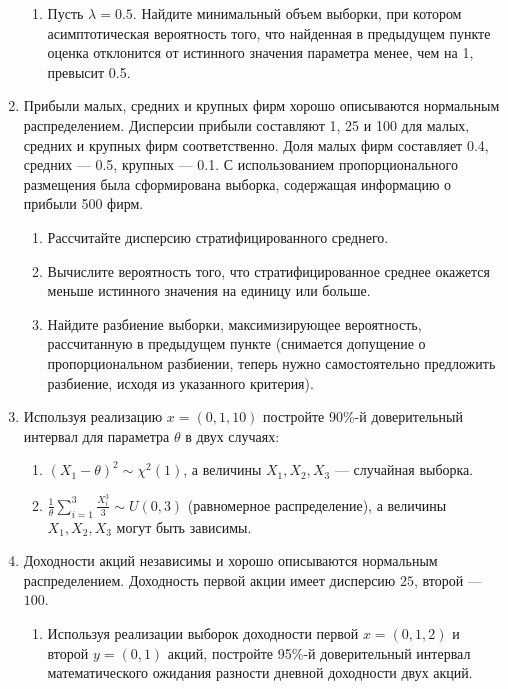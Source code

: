 \begin{enumerate}
\begin{enumerate}
\item Пусть $\lambda=0.5$. Найдите минимальный объем выборки, при котором асимптотическая вероятность того, 
что найденная в предыдущем пункте оценка отклонится от истинного значения параметра менее, чем на 1, превысит 0.5.
\end{enumerate}

\item Прибыли малых, средних и крупных фирм хорошо описываются нормальным распределением. 
Дисперсии прибыли составляют 1, 25 и 100 для малых, средних и крупных фирм соответственно. 
Доля малых фирм составляет 0.4, средних — 0.5, крупных — 0.1. С использованием пропорционального размещения была сформирована выборка, 
содержащая информацию о прибыли 500 фирм.
\begin{enumerate}
\item Рассчитайте дисперсию стратифицированного среднего.
\item Вычислите вероятность того, что стратифицированное среднее окажется меньше истинного значения на единицу или больше.
\item Найдите разбиение выборки, максимизирующее вероятность, рассчитанную в предыдущем пункте (снимается допущение о пропорциональном разбиении, 
теперь нужно самостоятельно предложить разбиение, исходя из указанного критерия).
\end{enumerate}


\item Используя реализацию $x=(0, 1, 10)$ постройте 90\%-й доверительный интервал для параметра $\theta$ в двух случаях:

\begin{enumerate}

\item $(X_{1}-\theta) ^ 2\sim \chi^2(1)$, а величины $X_1, X_2, X_3$ — случайная выборка.

\item $\frac{1}{\theta}\sum\limits_{i=1}^{3}\frac{X_{i}^3}{3}\sim U\left(0, 3\right)$ (равномерное распределение), 
а величины $X_1, X_2, X_3$ могут быть зависимы. 
\end{enumerate}

\item Доходности акций независимы и хорошо описываются нормальным распределением. Доходность первой акции имеет дисперсию $25$, второй — $100$. 

\begin{enumerate}

\item Используя реализации выборок доходности первой $x=(0,1,2)$ и второй $y=(0,1)$ акций, 
постройте 95\%-й доверительный интервал математического ожидания разности дневной доходности двух акций.


\end{enumerate}
\end{enumerate}
